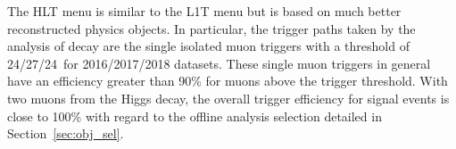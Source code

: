 The HLT menu is similar to the L1T menu but is based on much better reconstructed physics objects.
In particular, the trigger paths taken by the analysis of \hmm decay are the single isolated muon triggers 
with a \pt threshold of 24/27/24~\GeV for 2016/2017/2018 datasets.  
These single muon triggers in general have an efficiency greater than 90\% for muons above the trigger threshold. 
With two muons from the Higgs decay, the overall trigger efficiency for signal events is close to 100\% with regard to the offline analysis selection detailed in Section~\ref{sec:obj_sel}.

